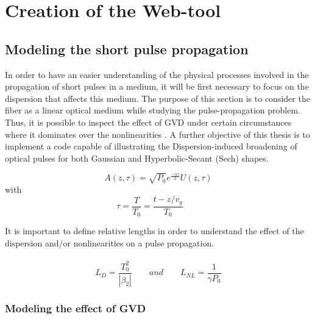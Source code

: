 \chapter{Creation of the Web-tool}



 \section{Modeling the short  pulse propagation}
    In order to have an easier understanding of the physical processes involved in the propagation of short pulses in a medium, it will be first necessary to focus on the dispersion that affects this medium. The purpose of this section is to consider the fiber as a linear optical medium while studying the pulse-propagation problem. Thus, it is possible to inspect the effect of GVD under certain circumstances where it dominates over the nonlinearities \citep{ AgrawalBook}. A further objective of this thesis is to implement a code capable of illustrating the Dispersion-induced broadening of optical pulses for both Gaussian and Hyperbolic-Secant (Sech) shapes.

        
  
            \begin{equation}\label{eq_A0}
                A(z,\tau ) = \sqrt{P_0}e^{\frac{-\alpha z}{2}} U(z,\tau)
            \end{equation}
            with
            \begin{equation}
                \tau =  \frac{T}{T_0} = \frac{t-z/v_g}{T_0} \qquad
            \end{equation}
        
        It is important to define relative lengths in order to understand the effect of the dispersion and/or nonlinearities on a pulse propagation.
            \ \\
            \ \\
            \begin{equation}
                L_D = \frac{T^2_0}{|\beta_2|} \qquad and \qquad L_{NL} = \frac{1}{\gamma P_0}
            \end{equation}
 
        
        \subsection{Modeling the effect of GVD}
   
 
            
